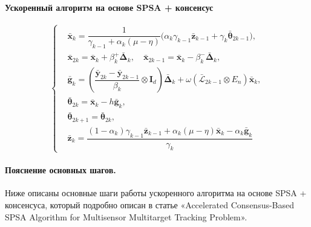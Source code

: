 \paragraph{Ускоренный алгоритм на основе SPSA + консенсус}


\[
\left\{
\begin{aligned}
  &\bar{\mathbf{x}}_k = \dfrac{1}{\gamma_{k-1} + \alpha_k(\mu - \eta)} \Big( \alpha_k \gamma_{k-1} \bar{\mathbf{z}}_{k-1} + \gamma_k \bar{\boldsymbol{\theta}}_{2k-1} \Big), \\[0.8em]
  &\bar{\mathbf{x}}_{2k} = \bar{\mathbf{x}}_k + \beta_k^+ \bar{\boldsymbol{\Delta}}_k, \quad
  \bar{\mathbf{x}}_{2k-1} = \bar{\mathbf{x}}_k - \beta_k^- \bar{\boldsymbol{\Delta}}_k, \\[0.8em]
  &\bar{\mathbf{g}}_k = \left( \dfrac{\bar{\mathbf{y}}_{2k} - \bar{\mathbf{y}}_{2k-1}}{\beta_k} \otimes \mathbf{I}_d \right) \bar{\boldsymbol{\Delta}}_k + \omega \left( \bar{\mathcal{L}}_{2k-1} \otimes E_n \right) \bar{\mathbf{x}}_k, \\[0.8em]
  &\bar{\boldsymbol{\theta}}_{2k} = \bar{\mathbf{x}}_k - h \bar{\mathbf{g}}_k, \\[0.5em]
  &\bar{\boldsymbol{\theta}}_{2k+1} = \bar{\boldsymbol{\theta}}_{2k}, \\[0.5em]
  &\bar{\mathbf{z}}_k = \dfrac{(1 - \alpha_k) \gamma_{k-1} \bar{\mathbf{z}}_{k-1} + \alpha_k (\mu - \eta) \bar{\mathbf{x}}_k - \alpha_k \bar{\mathbf{g}}_k}{\gamma_k}
\end{aligned}
\right.
\]

\paragraph{Пояснение основных шагов.}

Ниже описаны основные шаги работы ускоренного алгоритма на основе SPSA + консенсуса, который подробно описан в статье «Accelerated Consensus-Based SPSA Algorithm for Multisensor Multitarget Tracking Problem». 

